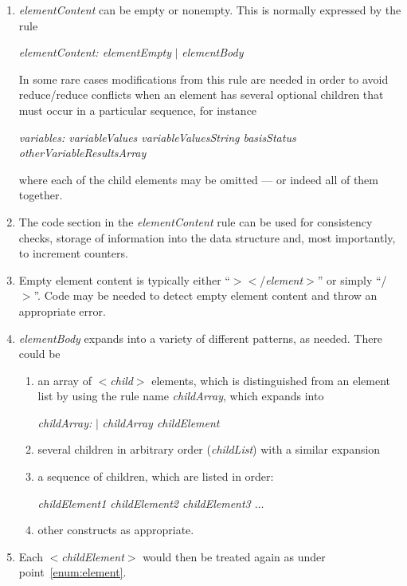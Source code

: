 \begin{enumerate}
\item	{\it elementContent\/} can be empty or nonempty. This is normally expressed by the rule

{\it elementContent: elementEmpty} $\vert$ {\it elementBody}

In some rare cases modifications from this rule are needed in order to avoid reduce/reduce conflicts 
when an element has several optional children that must occur in a particular sequence, for instance

{\it variables: variableValues variableValuesString basisStatus otherVariableResultsArray}

where each of the child elements may be omitted --- or indeed all of them together.

\item	The code section in the {\it elementContent\/} rule can be used for consistency checks, 
storage of information into the data structure and, most importantly, to increment counters. 

\item	Empty element content is typically either ``$><$/{\it element\/}$>$'' or simply ``/$>$''. 
Code may be needed to detect empty element content and throw an appropriate error.

\item	{\it elementBody\/} expands into a variety of different patterns, as needed. There could be
\begin{enumerate}
\item	an array of $<${\it child\/}$>$ elements, which is distinguished from an element list 
by using the rule name {\it childArray\/}, which expands into 

{\it childArray:} $\vert$ {\it childArray childElement}
\item	several children in arbitrary order ({\it childList}) with a similar expansion
\item      a sequence of children, which are listed in order:

{\it childElement1  childElement2  childElement3 $\ldots$}

\item	other constructs as appropriate.
\end{enumerate}
\item	Each $<${\it childElement\/}$>$ would then be treated again as under point~\ref{enum:element}.

\end{enumerate}
